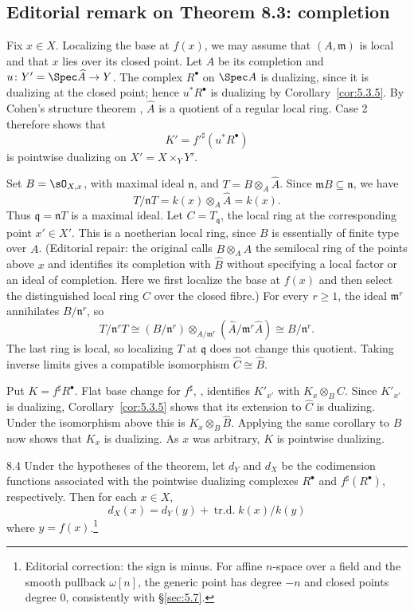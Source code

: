 \subsection*{Editorial remark on Theorem 8.3: completion}
Fix $x\in X$. Localizing the base at $f(x)$, we may assume that $(A,\mathfrak m)$ is local and that $x$ lies over its closed point. Let $\widehat A$ be its completion and $u\colon Y'=\Spec\widehat A\to Y$. The complex $R^\bullet$ on $\Spec A$ is dualizing, since it is dualizing at the closed point; hence $u^*R^\bullet$ is dualizing by Corollary~\ref{cor:5.3.5}. By Cohen's structure theorem \cite[\nopp (31.1)]{14}, $\widehat A$ is a quotient of a regular local ring. Case 2 therefore shows that
\[
K'=f'^{\sharp}(u^*R^\bullet)
\]
is pointwise dualizing on $X'=X\times_Y Y'$.\par
Set $B=\sO_{X,x}$, with maximal ideal $\mathfrak n$, and $T=B\otimes_A\widehat A$. Since $\mathfrak mB\subseteq\mathfrak n$, we have
\[
T/\mathfrak nT
 = k(x)\otimes_A\widehat A = k(x).
\]
Thus $\mathfrak q=\mathfrak nT$ is a maximal ideal. Let $C=T_{\mathfrak q}$, the local ring at the corresponding point $x'\in X'$. This is a noetherian local ring, since $B$ is essentially of finite type over $A$. (Editorial repair: the original calls $B\otimes_A\widehat A$ the semilocal ring of the points above $x$ and identifies its completion with $\widehat B$ without specifying a local factor or an ideal of completion. Here we first localize the base at $f(x)$ and then select the distinguished local ring $C$ over the closed fibre.)
For every $r\geq1$, the ideal $\mathfrak m^r$ annihilates $B/\mathfrak n^r$, so
\[
T/\mathfrak n^rT
 \cong (B/\mathfrak n^r)\otimes_{A/\mathfrak m^r}
                (\widehat A/\mathfrak m^r\widehat A)
 \cong B/\mathfrak n^r.
\]
The last ring is local, so localizing $T$ at $\mathfrak q$ does not change this quotient. Taking inverse limits gives a compatible isomorphism $\widehat C\cong\widehat B$.\par
Put $K=f^{\sharp}R^\bullet$. Flat base change for $f^\sharp$, , identifies $K'_{x'}$ with $K_x\otimes_B C$. Since $K'_{x'}$ is dualizing, Corollary~\ref{cor:5.3.5} shows that its extension to $\widehat C$ is dualizing. Under the isomorphism above this is $K_x\otimes_B\widehat B$. Applying the same corollary to $B$ now shows that $K_x$ is dualizing. As $x$ was arbitrary, $K$ is pointwise dualizing.


\begin{bookcorollary}{8.4}\label{cor:5.8.4}
Under the hypotheses of the theorem, let $d_{Y}$ and $d_{X}$ be the codimension functions associated with the pointwise dualizing complexes $R^{\bullet}$ and $f^{\sharp}(R^{\bullet})$, respectively. Then for each $x\in X$,
\[
d_{X}(x) = d_{Y}(y) + \operatorname{tr.d.} k(x)/k(y)
\]
where $y=f(x)$.\footnote{Editorial correction: the sign is minus. For affine $n$-space over a field and the smooth pullback $\omega[n]$, the generic point has degree $-n$ and closed points degree $0$, consistently with \S\ref{sec:5.7}.}
\end{bookcorollary}

